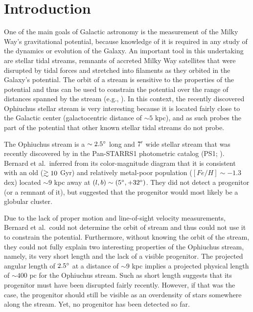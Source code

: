 \documentclass[iop]{emulateapj}
\begin{document}

\section{Introduction}\label{introduction}

One of the main goals of Galactic astronomy is the measurement of the Milky
Way's gravitational potential, because knowledge of it is required in any study
of the dynamics or evolution of the Galaxy. An important tool in this
undertaking are stellar tidal streams, remnants of accreted Milky Way satellites
that were disrupted by tidal forces and stretched into filaments as they orbited
in the Galaxy's potential. The orbit of a stream is sensitive to the properties
of the potential and thus can be used to constrain the potential over the range
of distances spanned by the stream (e.g., \citealt{kop10, new10, ses13, bel14}).
In this context, the recently discovered Ophiuchus stellar stream \citep{ber14b}
is very interesting because it is located fairly close to the Galactic center
(galactocentric distance of $\sim5$ kpc), and as such probes the part of the
potential that other known stellar tidal streams do not probe.

The Ophiuchus stream is a $\sim2.5\mbox{$^\circ$}$ long and $7\mbox{$^\prime$}$ wide stellar
stream that was recently discovered by \citet{ber14b} in the Pan-STARRS1
photometric catalog (PS1; \citealt{kai10}). Bernard et al.~inferred from its
color-magnitude diagram that it is consistent with an old ($\gtrsim10$ Gyr) and
relatively metal-poor population ($[Fe/H]\sim -1.3$ dex) located $\sim9$ kpc
away at $(l, b)\sim(5\mbox{$^\circ$}, +32\mbox{$^\circ$})$. They did not detect a progenitor (or
a remnant of it), but suggested that the progenitor would most likely be a
globular cluster.

Due to the lack of proper motion and line-of-sight velocity measurements,
Bernard et al.~could not determine the orbit of stream and thus could not use it
to constrain the potential. Furthermore, without knowing the orbit of the
stream, they could not fully explain two interesting properties of the
Ophiuchus stream, namely, its very short length and the lack of a visible
progenitor. The projected angular length of $2.5\mbox{$^\circ$}$ at a distance of
$\sim9$ kpc implies a projected physical length of $\sim400$ pc for the
Ophiuchus stream. Such as short length suggests that its progenitor must have
been disrupted fairly recently. However, if that was the case, the progenitor
should still be visible as an overdensity of stars somewhere along the stream.
Yet, no progenitor has been detected so far.
\end{document}

